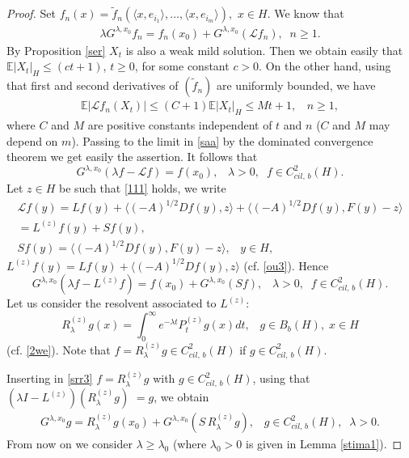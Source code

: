 \documentclass[preprint]{imsart}
\def\E{\mathbb E}
\def\L{\mathcal L}
\begin{document}
\begin{proof}
  Set  $f_n(x) = \tilde f_n (\langle  x, e_{i_1}\rangle, \ldots, \langle  x, e_{i_m} \rangle),$ $x \in H.$ We know  that 
  \begin{gather} \label{saa}
\lambda G^{\lambda,x_0} f_n = f_n(x_0) + G^{\lambda,x_0} (\L f_n),\;\; n \ge 1. 
\end{gather}
 By Proposition \ref{ser}
  $X_t$ is also a weak mild solution. Then  we obtain easily that $\E |X_t|_H \le (ct+1)$, $t \ge 0$, for some constant $c>0$. On the other hand, using that first and second derivatives of $(\tilde f_n)$ are uniformly bounded, we have
 \begin{gather*}
\E|\L f_n(X_t)| \le (C + 1 ) \E|X_t|_H \le M t +1, \,\, \;\;  n \ge 1,
\end{gather*}
 where $C$ and $M$ are positive constants independent of $t$ and $n$ ($C$ and $M$ may depend on $m$). Passing to the limit in \eqref{saa} by the dominated convergence theorem we get easily the assertion.
 It follows that   
\begin{equation*}
 G^{\lambda,x_0} (\lambda f - \L f) = f(x_0),\;\;\; \lambda >0,\;\; f \in C^{2}_{cil, \, b} (H).
\end{equation*}
Let  $z \in H$  be such that \eqref{111} holds, we write 
\begin{gather}
 \L f (y) =
L f(y)+\langle (-A)^{1/2}Df(y), z   \rangle  +  \langle (-A)^{1/2}Df(y),    F(y) -z \rangle 
\\ \nonumber =  L^{(z)} f(y) + Sf(y),
 \\ \nonumber   
 Sf(y) = \langle (-A)^{1/2}Df(y),   F(y) -z  \rangle,\;\;\; y \in H, 
\end{gather}
 $L^{(z)} f(y) = L f(y)+\langle (-A)^{1/2}Df(y), z   \rangle$ (cf. \eqref{ou3}). Hence  
 \begin{equation}\label{srr3}
G^{\lambda,x_0} (\lambda f - L^{(z)} f) = f(x_0) + G^{\lambda,x_0} (Sf),\;\;\; \lambda >0,\;\; f \in C^{2}_{cil, \, b} (H).
\end{equation}
  Let us consider the resolvent associated to $L^{(z)}$:
\begin{equation*}\label{erq}
R^{(z)}_{\lambda}  g (x) = \int_0^{\infty} e^{-\lambda t }   P_{t}^{(z)}  g(x) dt,\;\;\; g \in B_b(H),\; x \in H
\end{equation*} 
 (cf. \eqref{2we}). Note that  $f = R^{(z)}_{\lambda}  g \in C^{2}_{cil, \, b} (H)$ if $g \in C^{2}_{cil, \, b} (H).$ 
  


{ Inserting in  \eqref{srr3} $f = R^{(z)}_{\lambda}  g $ with $g \in C^{2}_{cil, \, b} (H)$, using that $(\lambda I - L^{(z)} ) (R^{(z)}_{\lambda}  g)$
 $=g$, we obtain 
\begin{gather} \label{s455}
G^{\lambda,x_0} g =  R^{(z)}_{\lambda}  g(x_0) + G^{\lambda,x_0} (S \, R^{(z)}_{\lambda} g), \;\; \; g \in C^{2}_{cil, \, b} (H) , \;\; \lambda >0.
\end{gather}
}
 From now on we consider  $\lambda \ge \lambda_0$ (where $\lambda_0 >0$ is given in Lemma \ref{stima1}). 
 

\end{proof}
\end{document}
